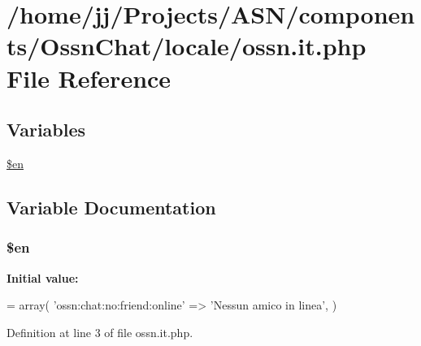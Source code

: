 \hypertarget{components_2_ossn_chat_2locale_2ossn_8it_8php}{}\section{/home/jj/\+Projects/\+A\+S\+N/components/\+Ossn\+Chat/locale/ossn.it.\+php File Reference}
\label{components_2_ossn_chat_2locale_2ossn_8it_8php}
\subsection*{Variables}
\begin{DoxyCompactItemize}
\item 
\hyperlink{components_2_ossn_chat_2locale_2ossn_8it_8php_a48abc714dfb71c8fffa83cf49f452115}{\$en}
\end{DoxyCompactItemize}


\subsection{Variable Documentation}
\subsubsection[{\texorpdfstring{\$en}{$en}}]{\setlength{\rightskip}{0pt plus 5cm}\$en}\hypertarget{components_2_ossn_chat_2locale_2ossn_8it_8php_a48abc714dfb71c8fffa83cf49f452115}{}\label{components_2_ossn_chat_2locale_2ossn_8it_8php_a48abc714dfb71c8fffa83cf49f452115}
{\bfseries Initial value\+:}
\begin{DoxyCode}
= array(
    \textcolor{stringliteral}{'ossn:chat:no:friend:online'} => \textcolor{stringliteral}{'Nessun amico in linea'},
)
\end{DoxyCode}


Definition at line 3 of file ossn.\+it.\+php.

